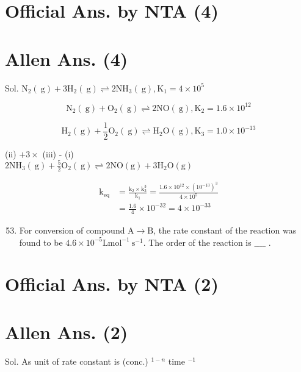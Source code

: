 \documentclass[10pt]{article}
\begin{document}
\section*{Official Ans. by NTA (4)}
\section*{Allen Ans. (4)}
Sol. \(\mathrm{N}_{2}(\mathrm{~g})+3 \mathrm{H}_{2}(\mathrm{~g}) \rightleftharpoons 2 \mathrm{NH}_{3}(\mathrm{~g}), \mathrm{K}_{1}=4 \times 10^{5}\)

\[
\mathrm{N}_{2}(\mathrm{~g})+\mathrm{O}_{2}(\mathrm{~g}) \rightleftharpoons 2 \mathrm{NO}(\mathrm{~g}), \mathrm{K}_{2}=1.6 \times 10^{12}
\]

\[
\mathrm{H}_{2}(\mathrm{~g})+\frac{1}{2} \mathrm{O}_{2}(\mathrm{~g}) \rightleftharpoons \mathrm{H}_{2} \mathrm{O}(\mathrm{~g}), \mathrm{K}_{3}=1.0 \times 10^{-13}
\]

(ii) \(+3 \times\) (iii) - (i)\\
\(2 \mathrm{NH}_{3}(\mathrm{~g})+\frac{5}{2} \mathrm{O}_{2}(\mathrm{~g}) \rightleftharpoons 2 \mathrm{NO}(\mathrm{g})+3 \mathrm{H}_{2} \mathrm{O}(\mathrm{g})\)

\[
\begin{aligned}
\mathrm{k}_{\mathrm{eq}} & =\frac{\mathrm{k}_{2} \times \mathrm{k}_{3}^{3}}{\mathrm{k}_{1}}=\frac{1.6 \times 10^{12} \times\left(10^{-13}\right)^{3}}{4 \times 10^{5}} \\
& =\frac{1.6}{4} \times 10^{-32}=4 \times 10^{-33}
\end{aligned}
\]

\begin{enumerate}
  \setcounter{enumi}{52}
  \item For conversion of compound \(\mathrm{A} \rightarrow \mathrm{B}\), the rate constant of the reaction was found to be \(4.6 \times 10^{-5} \mathrm{L} \mathrm{mol}^{-1} \mathrm{~s}^{-1}\). The order of the reaction is \(\_\_\_\_\) .
\end{enumerate}

\section*{Official Ans. by NTA (2)}
\section*{Allen Ans. (2)}
Sol. As unit of rate constant is (conc.) \({ }^{1-n}\) time \(^{-1}\)
\end{document}
